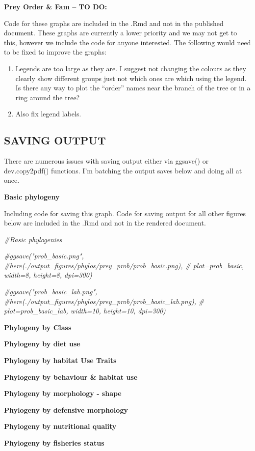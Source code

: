 \documentclass[
]{article}
\newenvironment{Shaded}{\begin{snugshade}}{\end{snugshade}}
\newcommand{\CommentTok}[1]{\textcolor[rgb]{0.56,0.35,0.01}{\textit{#1}}}
\begin{document}
\textbf{Prey Order \& Fam -- TO DO:}

Code for these graphs are included in the .Rmd and not in the published
document. These graphs are currently a lower priority and we may not get
to this, however we include the code for anyone interested. The
following would need to be fixed to improve the graphs:

\begin{enumerate}
\def\labelenumi{\arabic{enumi}.}
\item
  Legends are too large as they are. I suggest not changing the colours
  as they clearly show different groups just not which ones are which
  using the legend. Is there any way to plot the ``order'' names near
  the branch of the tree or in a ring around the tree?
\item
  Also fix legend labels.
\end{enumerate}

\hypertarget{saving-output}{%
\subsection{SAVING OUTPUT}\label{saving-output}}

There are numerous issues with saving output either via ggsave() or
dev.copy2pdf() functions. I'm batching the output saves below and doing
all at once.

\textbf{Basic phylogeny}

Including code for saving this graph. Code for saving output for all
other figures below are included in the .Rmd and not in the rendered
document.

\begin{Shaded}
\begin{Highlighting}[]
\CommentTok{\#Basic phylogenies}

\CommentTok{\#ggsave("prob\_basic.png",}
  \CommentTok{\#here(\textquotesingle{}./output\_figures/phylos/prey\_prob/prob\_basic.png\textquotesingle{}), }
\CommentTok{\#  plot=prob\_basic, width=8, height=8, dpi=300)}

\CommentTok{\#ggsave("prob\_basic\_lab.png",}
  \CommentTok{\#here(\textquotesingle{}./output\_figures/phylos/prey\_prob/prob\_basic\_lab.png\textquotesingle{}), }
\CommentTok{\#  plot=prob\_basic\_lab, width=10, height=10, dpi=300)}
\end{Highlighting}
\end{Shaded}

\textbf{Phylogeny by Class}

\textbf{Phylogeny by diet use}

\textbf{Phylogeny by habitat Use Traits}

\textbf{Phylogeny by behaviour \& habitat use}

\textbf{Phylogeny by morphology - shape}

\textbf{Phylogeny by defensive morphology}

\textbf{Phylogeny by nutritional quality}

\textbf{Phylogeny by fisheries status}
\end{document}
